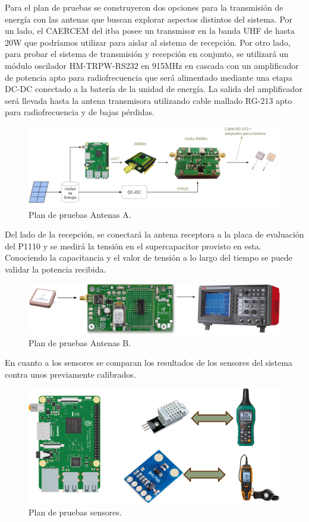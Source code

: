 Para el plan de pruebas se construyeron dos opciones para la transmisión de energía con las antenas que buscan explorar aspectos distintos del sistema. Por un lado, el CAERCEM del itba posee un transmisor en la banda UHF de hasta 20W que podríamos utilizar para aislar al sistema de recepción. Por otro lado, para probar el sistema de transmisión y recepción en conjunto, se utilizará un módulo oscilador HM-TRPW-RS232 en 915MHz en cascada con un amplificador de potencia apto para radiofrecuencia que será alimentado mediante una etapa DC-DC conectado a la batería de la unidad de energía. La salida del amplificador será llevada hasta la antena transmisora utilizando cable mallado RG-213 apto para radiofrecuencia y de bajas pérdidas.

\begin{figure}[H]
	\centering
	\includegraphics[width=0.9\linewidth]{ImagenesIngenieria de Detalle/planDePruebasAntenasA}	
	\caption{Plan de pruebas Antenas A.}
	\label{fig:planDePruebasAntenasA}
\end{figure}

Del lado de la recepción, se conectará la antena receptora a la placa de evaluación del P1110 y se medirá la tensión en el supercapacitor provisto en esta. Conociendo la capacitancia y el valor de tensión a lo largo del tiempo se puede validar la potencia recibida.


\begin{figure}[H]
	\centering
	\includegraphics[width=0.8\linewidth]{ImagenesIngenieria de Detalle/planDePruebasAntenasB}	
	\caption{Plan de pruebas Antenas B.}
	\label{fig:planDePruebasAntenasB}
\end{figure}

En cuanto a los sensores se comparan los resultados de los sensores del sistema contra unos previamente calibrados.

\begin{figure}[H]
	\centering
	\includegraphics[width=0.8\linewidth]{ImagenesIngenieria de Detalle/planDePruebasSensores}	
	\caption{Plan de pruebas sensores.}
	\label{fig:planDePruebasSensores}
\end{figure}